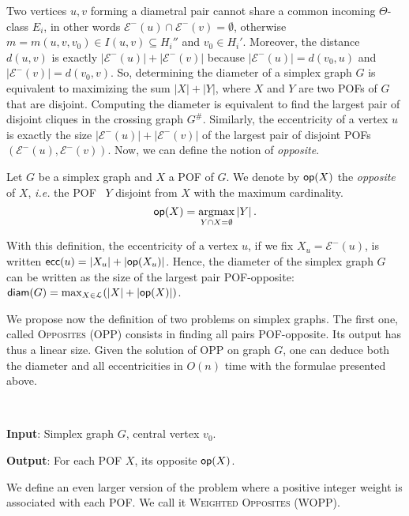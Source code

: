 \documentclass[a4paper,UKenglish,numberwithinsect,cleveref, autoref]{lipics-v2021}
\DeclareMathOperator*{\argmax}{argmax}
\newcommand{\card}[1]{\left| #1 \right|}
\newcommand{\diam}{\mbox{\textsf{diam}}}
\newcommand{\ecc}{\mbox{\textsf{ecc}}}
\newcommand{\opp}{\mbox{\textsf{op}}}
\begin{document}
Two vertices $u,v$ forming a diametral pair cannot share a common incoming $\Theta$-class $E_i$, in other words $\mathcal{E}^-(u) \cap \mathcal{E}^-(v) = \emptyset$, otherwise $m = m(u,v,v_0) \in I(u,v) \subseteq H_i''$ and $v_0 \in H_i'$. Moreover, the distance $d(u,v)$ is exactly $\card{\mathcal{E}^-(u)} + \card{\mathcal{E}^-(v)}$ because $\card{\mathcal{E}^-(u)} = d(v_0,u)$ and $\card{\mathcal{E}^-(v)} = d(v_0,v)$. So, determining the diameter of a simplex graph $G$ is equivalent to maximizing the sum $\card{X} + \card{Y}$, where $X$ and $Y$ are two POFs of $G$ that are disjoint. Computing the diameter is equivalent to find the largest pair of disjoint cliques in the crossing graph $G^{\#}$. Similarly, the eccentricity of a vertex $u$ is exactly the size $\card{\mathcal{E}^-(u)} + \card{\mathcal{E}^-(v)}$ of the largest pair of disjoint POFs $(\mathcal{E}^-(u),\mathcal{E}^-(v))$.
Now, we can define the notion of \textit{opposite}.

\begin{definition}
Let $G$ be a simplex graph and $X$ a POF of $G$. We denote by $\opp(X)$ the \textit{opposite} of $X$, {\em i.e.} the POF~ $Y$ disjoint from $X$ with the maximum cardinality.
\[
\opp(X) = \argmax_{Y \cap X = \emptyset} \card{Y}.
\]
\label{def:opposite}
\end{definition}

With this definition, the eccentricity of a vertex $u$, if we fix $X_u = \mathcal{E}^-(u)$, is written $\ecc(u) = \card{X_u} + \card{\opp(X_u)}$. Hence, the diameter of the simplex graph $G$ can be written as the size of the largest pair POF-opposite: $\diam(G) = \max_{X\in \mathcal{L}}( \card{X} + \card{\opp(X)})$.

We propose now the definition of two problems on simplex graphs. The first one, called \textsc{Opposites} (OPP) consists in finding all pairs POF-opposite. Its output has thus a linear size. Given the solution of OPP on graph $G$, one can deduce both the diameter and all eccentricities in $O(n)$ time with the formulae presented above.

\begin{definition}[OPP]~

\textbf{Input}: Simplex graph $G$, central vertex $v_0$.

\textbf{Output}: For each POF $X$, its opposite $\opp(X)$.
\label{def:dpp}
\end{definition}

We define an even larger version of the problem where a positive integer weight is associated with each POF. We call it \textsc{Weighted Opposites} (WOPP).
\end{document}
